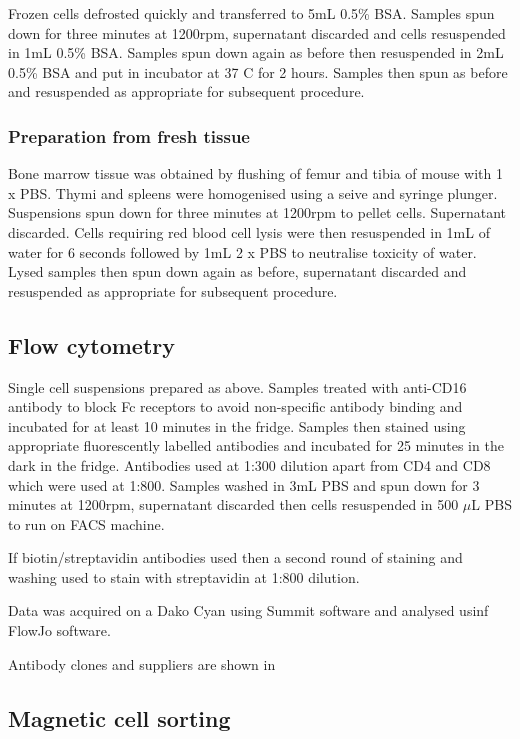 Frozen cells defrosted quickly and transferred to 5mL 0.5\% BSA.
Samples spun down for three minutes at 1200rpm, supernatant discarded and cells resuspended in 1mL 0.5\% BSA.
Samples spun down again as before then resuspended in 2mL 0.5\% BSA and put in incubator at 37 \textdegree C for 2 hours.
Samples then spun as before and resuspended as appropriate for subsequent procedure.

\subsubsection{Preparation from fresh tissue}
Bone marrow tissue was obtained by flushing of femur and tibia of mouse with 1 x PBS.
Thymi and spleens were homogenised using a seive and syringe plunger.
Suspensions spun down for three minutes at 1200rpm to pellet cells.
Supernatant discarded.
Cells requiring red blood cell lysis were then resuspended in 1mL of water for 6 seconds followed by 1mL 2 x PBS to neutralise toxicity of water.
Lysed samples then spun down again as before, supernatant discarded and resuspended as appropriate for subsequent procedure.

\subsection{Flow cytometry}

Single cell suspensions prepared as above.
Samples treated with anti-CD16 antibody to block Fc receptors to avoid non-specific antibody binding and incubated for at least 10 minutes in the fridge.
Samples then stained using appropriate fluorescently labelled antibodies and incubated for 25 minutes in the dark in the fridge.
Antibodies used at 1:300 dilution apart from CD4 and CD8 which were used at 1:800. 
Samples washed in 3mL PBS and spun down for 3 minutes at 1200rpm, supernatant discarded then cells resuspended in 500 $\mu$L PBS to run on FACS machine.

If biotin/streptavidin antibodies used then a second round of staining and washing used to stain with streptavidin at 1:800 dilution.

Data was acquired on a Dako Cyan using Summit software and analysed usinf FlowJo software.

Antibody clones and suppliers are shown in 

\subsection{Magnetic cell sorting}
\label{Methods:MACSdepletion}

